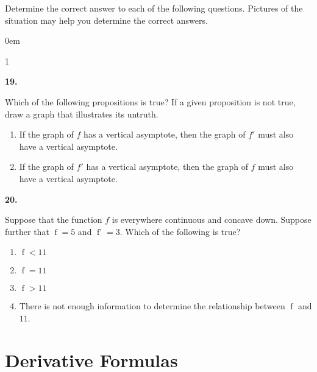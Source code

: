 \documentclass[12pt,]{book}
\newcommand{\lt}{<}
\newcommand{\gt}{>}
\theoremstyle{plain}
\theoremstyle{definition}
\numberwithin{equation}{section}
\newenvironment{exercisegroup}%
{\medskip\noindent}%
{\par\bigskip}%
\newlength{\exercisegroupindent}%
\newlength{\exercisegroupitemwidth}%
\newenvironment{exercisegrouplist}%
{\vspace{-\partopsep}%
\begin{adjustwidth}{\exercisegroupindent}{0em}}%
{\end{adjustwidth}%
\vspace{-\partopsep}%
\vspace{\baselineskip}}%
\newenvironment{exercisegroupbycol}[1]%
{\begin{exercisegrouplist}%
\vspace{-\multicolsep}%
\begin{multicols}{#1}%
\setlength{\parindent}{0em}%
\setlength{\exercisegroupitemwidth}{\linewidth}}%
{\end{multicols}%
\vspace{-\multicolsep}%
\end{exercisegrouplist}}%
\newenvironment{exercisegroupitem}[1]%
{\begin{minipage}[t]{\exercisegroupitemwidth}
\vspace{0pt}%
{\bfseries#1}%
\rule{0pt}{\baselineskip}}{\strut%
\end{minipage}%
\hspace{\columnsep}}%
\providecommand\phantomsection{}
\newcommand{\fe}[2]{\mathop{{#1}{\left(#2\right)}}}
\newcommand{\fd}[1]{#1'}
\begin{document}
\begin{exercisegroup}%
Determine the correct answer to each of the following questions.  Pictures of the situation may help you determine the correct answers.%
\begin{exercisegroupbycol}{1}%
\begin{exercisegroupitem}{19. }\phantomsection\hypertarget{exercise-220}{\null}
Which of the following propositions is true? If a given proposition is not true, draw a graph that illustrates its untruth.%
\begin{enumerate}[label=(\alph*)]
\item{}If the graph of \(f\) has a vertical asymptote, then the graph of \(\fd{f}\) must also have a vertical asymptote.\item{}If the graph of \(\fd{f}\) has a vertical asymptote, then the graph of \(f\) must also have a vertical asymptote.\end{enumerate}
\end{exercisegroupitem}%
\par%
\begin{exercisegroupitem}{20. }\phantomsection\hypertarget{exercise-221}{\null}
Suppose that the function \(f\) is everywhere continuous and concave down.  Suppose further that \(\fe{f}{7}=5\) and \(\fe{\fd{f}}{7}=3\).  Which of the following is true?%
\begin{enumerate}[label=(\alph*)]
\item{}\(\fe{f}{9}\lt11\)\item{}\(\fe{f}{9}=11\)\item{}\(\fe{f}{9}\gt11\)\item{}There is not enough information to determine the relationship between \(\fe{f}{9}\) and \(11\).\end{enumerate}
\end{exercisegroupitem}%
\par%
\end{exercisegroupbycol}%
\end{exercisegroup}%
\typeout{************************************************}
\typeout{************************************************}
\chapter[Derivative Formulas]{Derivative Formulas}\label{chapter-derivative-formulas}
\typeout{************************************************}
\typeout{************************************************}
\end{document}
